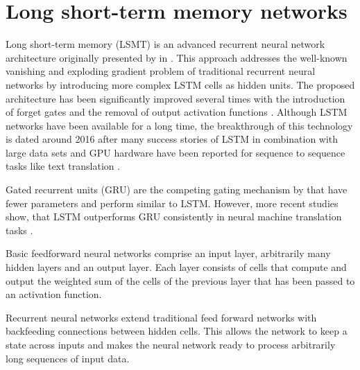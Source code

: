 \section{Long short-term memory networks}

Long short-term memory (LSMT) is an advanced recurrent neural network architecture originally presented by \citeauthor{DBLP:journals/neco/HochreiterS97} in \citeyear{DBLP:journals/neco/HochreiterS97}  \cite{DBLP:journals/neco/HochreiterS97}.
This approach addresses the well-known vanishing and exploding gradient problem \cite{DBLP:conf/icml/PascanuMB13}  of traditional recurrent neural networks by introducing more complex LSTM cells as hidden units.
The proposed architecture has been significantly improved several times with the introduction of forget gates \cite{DBLP:journals/neco/GersSC00} and the removal of output activation functions \cite {DBLP:journals/tnn/GreffSKSS17}.
Although LSTM networks have been available for a long time, the breakthrough of this technology is dated around 2016 after many success stories of LSTM in combination with large data sets and GPU hardware have been reported for sequence to sequence tasks like text translation \cite{DBLP:journals/corr/WuSCLNMKCGMKSJL16}.


Gated recurrent units (GRU) \cite{DBLP:conf/emnlp/ChoMGBBSB14} are the competing gating mechanism by \citeauthor{DBLP:conf/emnlp/ChoMGBBSB14} that have fewer parameters and perform similar to LSTM.
However, more recent studies show, that LSTM outperforms GRU consistently in neural machine translation tasks \cite{DBLP:journals/corr/BritzGLL17}.

Basic feedforward neural networks comprise an input layer, arbitrarily many hidden layers and an output layer. Each layer consists of cells that compute and output the weighted sum of the cells of the previous layer that has been passed to an activation function.


Recurrent neural networks extend traditional feed forward networks with backfeeding connections between hidden cells.
This allows the network to keep a state across inputs and makes the neural network ready to process arbitrarily long sequences of input data.





